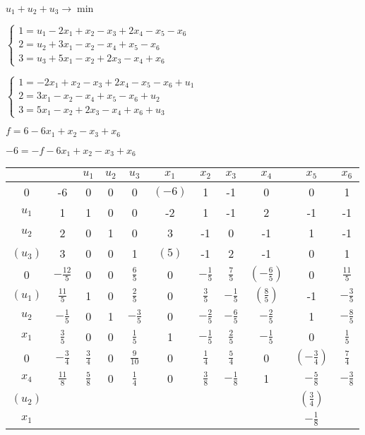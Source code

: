 \documentclass[russian]{article}
\begin{document}
$u_1 + u_2 + u_3 \to \min$

$\begin{cases}
1 =u_1 - 2 x_1 + x_2 - x_3 + 2 x_4 - x_5 - x_6\\
2 =u_2 + 3 x_1 - x_2 - x_4 + x_5 - x_6\\
3 =u_3 +  5 x_1 - x_2 + 2 x_3 - x_4 + x_6
\end{cases}$

$\begin{cases}
1 = - 2 x_1 + x_2 - x_3 + 2 x_4 - x_5 - x_6 + u_1\\
2 = 3 x_1 - x_2 - x_4 + x_5 - x_6 + u_2\\
3 = 5 x_1 - x_2 + 2 x_3 - x_4 + x_6 + u_3
\end{cases}$

$f=6 - 6 x_1 + x_2 - x_3 + x_6$

$-6=-f - 6 x_1 + x_2 - x_3 + x_6$

\begin{tabular}{|c|c|ccccccccc|} \hline
 & & $u_1$ & $u_2$ & $u_3$ & $x_1$ & $x_2$ & $x_3$ & $x_4$ & $x_5$ & $x_6$  \\\hline

0 & -6 & 0 & 0 & 0 & $(-6)$ & 1 & -1 & 0 & 0 & 1 \\
$u_1$ & 1 & 1 & 0 & 0 & -2 & 1 & -1 & 2 & -1 & -1 \\
$u_2$ & 2 & 0 & 1 & 0 & 3 & -1 & 0 & -1 & 1 & -1 \\
$(u_3)$ & 3 & 0 & 0 & 1 & $(5)$ & -1 & 2 & -1 & 0 & 1 \\\hline

0 & $-\frac{12}{5}$ & 0 & 0 & $\frac{6}{5}$ & 0 & $-\frac{1}{5}$ & $\frac{7}{5}$ & $(-\frac{6}{5})$ & 0 &  $\frac{11}{5}$ \\
$(u_1)$ & $\frac{11}{5}$ & 1 & 0 & $\frac{2}{5}$ & 0 & $\frac{3}{5}$ & $-\frac{1}{5}$ & $(\frac{8}{5})$ & -1 & $-\frac{3}{5}$ \\
$u_2$ & $-\frac{1}{5}$ & 0 & 1 & $-\frac{3}{5}$ & 0 & $-\frac{2}{5}$ & $-\frac{6}{5}$ & $-\frac{2}{5}$ & 1 & $-\frac{8}{5}$ \\
$x_1$ & $\frac{3}{5}$ & 0 & 0 & $\frac{1}{5}$ & 1 & $-\frac{1}{5}$ & $\frac{2}{5}$ & $-\frac{1}{5}$ & 0 & $\frac{1}{5}$ \\\hline

0 & $-\frac{3}{4}$ & $\frac{3}{4}$ & 0 & $\frac{9}{10}$ & 0 & $\frac{1}{4}$ & $\frac{5}{4}$ & 0 & $(-\frac{3}{4})$ & $\frac{7}{4}$ \\
$x_4$ & $\frac{11}{8}$ & $\frac{5}{8}$ & 0 & $\frac{1}{4}$ & 0 & $\frac{3}{8}$ & $-\frac{1}{8}$ & 1 & $-\frac{5}{8}$ & $-\frac{3}{8}$ \\
$(u_2)$ & & & & & & & & & $(\frac{3}{4})$ & \\
$x_1$ & & & & & & & & & $-\frac{1}{8}$ & \\\hline
\end{tabular}
\end{document}
